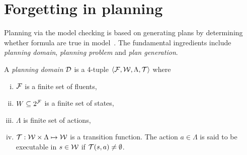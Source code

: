 \documentclass[letterpaper]{article} %
\begin{document}
%
%




\section{Forgetting in planning}
Planning via the model checking is based on generating plans by determining whether formula are true in model~\cite{giunchiglia1999planning}. The fundamental ingredients include \emph{planning domain}, \emph{planning problem} and \emph{plan generation}.

A \emph{planning domain} ${\cal D}$ is a 4-tuple ${\langle{{\cal F}, {\cal W}, \Lambda, \cal T}\rangle}$ where 
\begin{enumerate}[(i)]
  \item $\cal F$ is a finite set of fluents,
  \item $W \subseteq 2^{\cal F}$ is a finite set of states,
  \item $\Lambda$ is finite set of actions,
  \item ${\cal T} : {\cal W} \times \Lambda \mapsto \cal W$ is a transition function. The action $a\in \Lambda$ is said to be executable in $s\in \cal W$ if ${\cal T}(s,a) \neq \emptyset$.
\end{enumerate}
\end{document}
